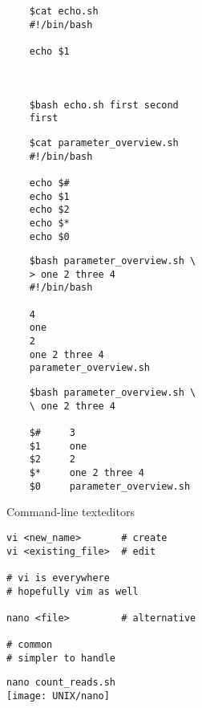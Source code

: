\documentclass[xcolor=dvipsnames]{beamer}
\begin{document}
\begin{frame}[fragile]
\LARGE
\begin{verbatim}
	$cat echo.sh
	#!/bin/bash

	echo $1



	$bash echo.sh first second
	first
\end{verbatim}
\end{frame}

\begin{frame}[fragile]
\LARGE
\begin{verbatim}
	$cat parameter_overview.sh
	#!/bin/bash

	echo $#
	echo $1
	echo $2
	echo $*
	echo $0
\end{verbatim}
\end{frame}

\begin{frame}[fragile]
\LARGE
\begin{verbatim}
	$bash parameter_overview.sh \
	> one 2 three 4
	#!/bin/bash

	4
	one
	2
	one 2 three 4
	parameter_overview.sh
\end{verbatim}
\end{frame}

\begin{frame}[fragile]
\LARGE
\begin{verbatim}
	$bash parameter_overview.sh \
	\ one 2 three 4

	$#     3
	$1     one
	$2     2
	$*     one 2 three 4
	$0     parameter_overview.sh
\end{verbatim}
\end{frame}

\begin{frame}[fragile]
	\begin{center}
		\Huge
		Command-line texteditors
	\end{center}
	\Large
\begin{verbatim}
vi <new_name>       # create
vi <existing_file>  # edit

# vi is everywhere
# hopefully vim as well

nano <file>         # alternative

# common
# simpler to handle
\end{verbatim}
\end{frame}

\begin{frame}[fragile]
	\begin{center}
		\Large
		\verb!nano count_reads.sh! \\
		\vspace{1cm}
		\texttt{[image: UNIX/nano]}
	\end{center}
\end{frame}
\end{document}
